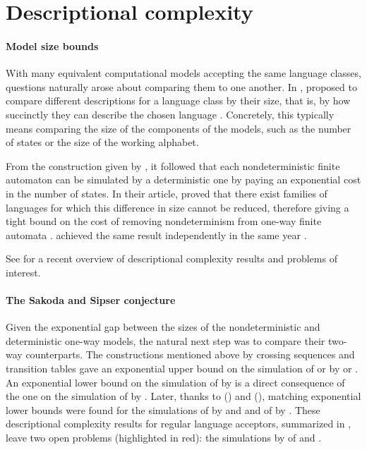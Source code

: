\section{Descriptional complexity}\label{sec:context-descrcomp}

\paragraph{Model size bounds} With many equivalent computational models accepting the same language classes, questions naturally arose about comparing them to one another.
In \citeyear{MeyFis71}, \citeauthor{MeyFis71} proposed to compare different descriptions for a language class by their size, that is, by how succinctly they can describe the chosen language \cite{MeyFis71}.
Concretely, this typically means comparing the size of the components of the models, such as the number of states or the size of the working alphabet.

From the construction given by \citeauthor{RabSco59}, it followed that each nondeterministic finite automaton can be simulated by a deterministic one by paying an exponential cost in the number of states.
In their article, \citeauthor{MeyFis71} proved that there exist families of languages for which this difference in size cannot be reduced, therefore giving a tight bound on the cost of removing nondeterminism from one-way finite automata \cite{MeyFis71}.
\citeauthor{Moo71} achieved the same result independently in the same year \cite{Moo71}.

See \cite{KutMor+21} for a recent overview of descriptional complexity results and problems of interest.

\paragraph{The Sakoda and Sipser conjecture} Given the exponential gap between the sizes of the nondeterministic and deterministic one-way models, the natural next step was to compare their two-way counterparts.
The constructions mentioned above by crossing sequences \cite{RabSco59} and transition tables \cite{She59} gave an exponential upper bound on the simulation of \TNFAs or \TDFAs by \ONFAs or \ODFAs.
An exponential lower bound on the simulation of \TNFAs by \ODFAs is a direct consequence of the one on the simulation of \ONFAs by \ODFAs.
Later, thanks to \citeauthor{Bir93} (\citeyear{Bir93}) and \citeauthor{Kap05} (\citeyear{Kap05}), matching exponential lower bounds were found for the simulations of \TDFAs by \ONFAs and \ODFAs and of \TNFAs by \ONFAs \cite{Bir93,Kap05}.
These descriptional complexity results for regular language acceptors, summarized in , leave two open problems (highlighted in red): the simulations by \TDFAs of \TNFAs and \ONFAs.

